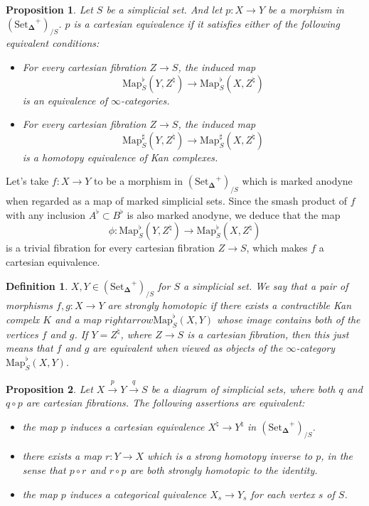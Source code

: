 \documentclass[12pt]{amsart}
\newcommand{\8}{\ensuremath{\infty}}
\newcommand{\SSet}{\ensuremath{\text{Set}_{\boldsymbol{\Delta}}}}
\newcommand{\Map}{\ensuremath{\text{Map}}}
\newtheorem{definition}{Definition}
\newtheorem{proposition}{Proposition}
\begin{document}
\begin{proposition}
  Let $S$ be a simplicial set. And let $p: X \rightarrow Y$ be a morphism in $(\SSet^+)_{/S}$. $p$ is a cartesian equivalence if it satisfies either of the following equivalent conditions:
  \begin{itemize}
    \item[(1)] For every cartesian fibration $Z \rightarrow S$, the induced map
          \[\Map^\flat_S(Y, Z^\natural) \rightarrow \Map_S^\flat(X, Z^\natural)\] is an equivalence of \8-categories.
    \item[(2)] For every cartesian fibration $Z \rightarrow S$, the induced map \[\Map^\sharp_S(Y, Z^\natural) \rightarrow \Map_S^\sharp(X, Z^\natural)\] is a homotopy equivalence of Kan complexes.
  \end{itemize}
\end{proposition}

Let's take $f: X \rightarrow Y$ to be a morphism in $(\SSet^+)_{/S}$ which is marked anodyne when regarded as a map of marked simplicial sets. Since the smash product of $f$ with any inclusion $A^\flat\subset B^\flat$ is also marked anodyne, we deduce that the map \[\phi: \Map_S^\flat(Y, Z^\natural) \rightarrow \Map_S^\flat(X, Z^\natural)\] is a trivial fibration for every cartesian fibration $Z \rightarrow S$, which makes $f$ a cartesian equivalence.

\begin{definition}
  $X, Y \in (\SSet^+)_{/S}$ for $S$ a simplicial set. We say that a pair of morphisms $f, g: X \rightarrow Y$ are strongly homotopic if there exists a contractible Kan compelx $K$ and a map $rightarrow \Map^\flat_S(X, Y)$ whose image contains both of the vertices $f$ and $g$. If $Y = Z^\natural$, where $Z \rightarrow S$ is a cartesian fibration, then this just means that $f$ and $g$ are equivalent when viewed as objects of the \8-category $\Map_S^\flat(X, Y)$.
\end{definition}

\begin{proposition}
  Let $X \xrightarrow{p} Y \xrightarrow{q} S$ be a diagram of simplicial sets, where both $q$ and $q\circ p$ are cartesian fibrations. The following assertions are equivalent:
  \begin{itemize}
    \item[(1)] the map $p$ induces a cartesian equivalence $X^\natural \rightarrow Y^\natural$ in $(\SSet^+)_{/S}$.
    \item[(2)] there exists a map $r: Y \rightarrow X$ which is a strong homotopy inverse to $p$, in the sense that $p\circ r$ and $r\circ p$ are both strongly homotopic to the identity.
    \item[(3)] the map $p$ induces a categorical quivalence $X_s \rightarrow Y_s$ for each vertex $s$ of $S$.
  \end{itemize}
\end{proposition}
\end{document}
